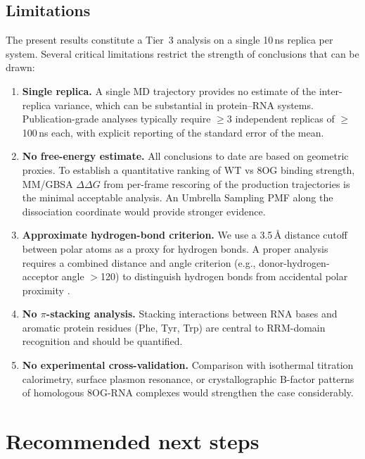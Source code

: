 \documentclass[11pt,a4paper]{article}
\begin{document}
\subsection{Limitations}
The present results constitute a Tier~3 analysis on a single 10\,ns replica
per system. Several critical limitations restrict the strength of
conclusions that can be drawn:

\begin{enumerate}[leftmargin=*]
\item \textbf{Single replica.} A single MD trajectory provides no estimate
of the inter-replica variance, which can be substantial in protein--RNA
systems. Publication-grade analyses typically require $\geq$3 independent
replicas of $\geq$100\,ns each, with explicit reporting of the standard
error of the mean.

\item \textbf{No free-energy estimate.} All conclusions to date are based
on geometric proxies. To establish a quantitative ranking of WT vs 8OG
binding strength, MM/GBSA $\Delta\Delta G$ from per-frame rescoring of
the production trajectories is the minimal acceptable analysis. An
Umbrella Sampling PMF along the dissociation coordinate would provide
stronger evidence.

\item \textbf{Approximate hydrogen-bond criterion.} We use a 3.5\,\si{\angstrom}
distance cutoff between polar atoms as a proxy for hydrogen bonds. A
proper analysis requires a combined distance and angle criterion (e.g.,
donor-hydrogen-acceptor angle $>$120\textdegree) to distinguish hydrogen
bonds from accidental polar proximity \citep{Krivov2014}.

\item \textbf{No $\pi$-stacking analysis.} Stacking interactions between
RNA bases and aromatic protein residues (Phe, Tyr, Trp) are central to
RRM-domain recognition and should be quantified.

\item \textbf{No experimental cross-validation.} Comparison with
isothermal titration calorimetry, surface plasmon resonance, or
crystallographic B-factor patterns of homologous 8OG-RNA complexes would
strengthen the case considerably.
\end{enumerate}

\section{Recommended next steps}
\label{sec:next}
\end{document}
